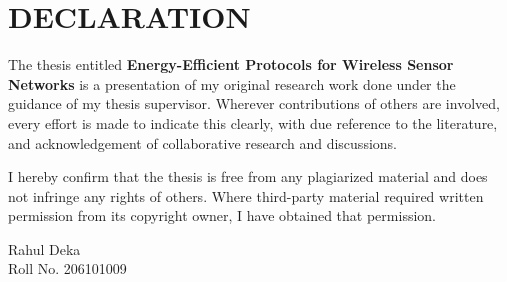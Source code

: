 \chapter*{DECLARATION}
The thesis entitled \textbf{Energy-Efficient Protocols for Wireless Sensor Networks} is a presentation of my original research work
done under the guidance of my thesis supervisor. Wherever contributions of others are involved,
every effort is made to indicate this clearly, with due reference to the literature, and
acknowledgement of collaborative research and discussions.\par
\vspace{0.6em}
I hereby confirm that the thesis is free from any plagiarized material and does not infringe any
rights of others. Where third-party material required written permission from its copyright
owner, I have obtained that permission.\par
\vspace{1in}
\noindent Rahul Deka\\Roll No. 206101009
\clearpage
